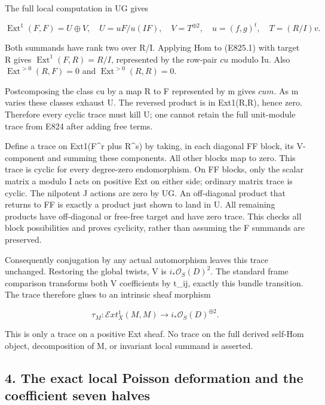 The full local computation in UG gives

\[
 \operatorname{Ext}^1(F,F)
   =U\oplus V,\quad U=uF/u(IF),\quad V=T^{\oplus2},\quad
 u=(f,g)^t,\quad T=(R/I)v.
 \tag{E825.8}
\]

Both summands have rank two over R/I. Applying Hom to (E825.1) with
target R gives \(\operatorname{Ext}^1(F,R)=R/I\), represented by the
row-pair \(c u\) modulo Iu. Also \(\operatorname{Ext}^{>0}(R,F)=0\) and
\(\operatorname{Ext}^{>0}(R,R)=0\).

Postcomposing the class cu by a map R to F represented by m gives
\(c u m\). As m varies these classes exhaust U. The reversed product is
in Ext1(R,R), hence zero. Therefore every cyclic trace must kill U; one
cannot retain the full unit-module trace from E824 after adding free
terms.

Define a trace on Ext1(F\^{}r plus R\^{}s) by taking, in each diagonal
FF block, its V-component and summing these components. All other blocks
map to zero. This trace is cyclic for every degree-zero endomorphism. On
FF blocks, only the scalar matrix a modulo I acts on positive Ext on
either side; ordinary matrix trace is cyclic. The nilpotent J actions
are zero by UG. An off-diagonal product that returns to FF is exactly a
product just shown to land in U. All remaining products have
off-diagonal or free-free target and have zero trace. This checks all
block possibilities and proves cyclicity, rather than assuming the F
summands are preserved.

Consequently conjugation by any actual automorphism leaves this trace
unchanged. Restoring the global twists, V is \(i_*\mathcal O_S(D)^2\).
The standard frame comparison transforms both V coefficients by t\_ij,
exactly this bundle transition. The trace therefore glues to an
intrinsic sheaf morphism

\[
 \tau_M:\mathcal E xt^1_X(M,M)\longrightarrow
                  i_*\mathcal O_S(D)^{\oplus2}.
 \tag{E825.9}
\]

This is only a trace on a positive Ext sheaf. No trace on the full
derived self-Hom object, decomposition of M, or invariant local summand
is asserted.

\subsection{4. The exact local Poisson deformation and the coefficient
seven
halves}\label{SF-E825:the-exact-local-poisson-deformation-and-the-coefficient-seven-halves}

